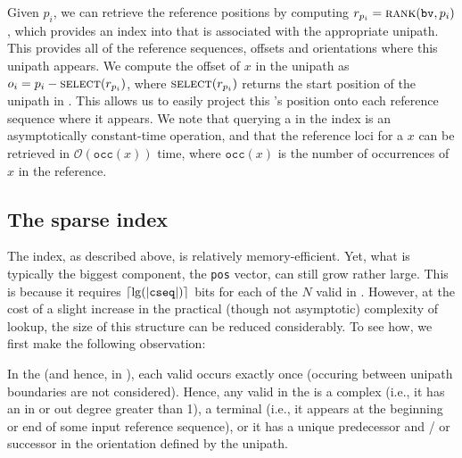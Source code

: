   Given $p_{i}$, we can retrieve the reference positions by computing $r_{p_i} =
  \mbox{\sc rank}(\texttt{bv}, p_{i})$, which provides an index into \ctab that is
  associated with the appropriate unipath. This provides all of the reference
  sequences, offsets and orientations where this unipath appears. We compute the
  offset of \kmer $x$ in the unipath as $o_{i} = p_{i} - \mbox{\sc select}(r_{p_i})$, where $\mbox{\sc select}(r_{p_i})$ returns the start position of the unipath in \ctab. This allows us to easily project this \kmer's position onto each reference sequence where it appears. We note that querying a \kmer in the \pufferfish index is
  an asymptotically constant-time operation, and that the reference loci for a
  \kmer $x$ can be retrieved in $\mathcal{O}(\texttt{occ}(x))$ time, where $\texttt{occ}(x)$
  is the number of occurrences of $x$ in the reference.

  \subsection*{The sparse \pufferfish index} \label{subsec:sparse}

  The \pufferfish index, as described above, is relatively memory-efficient. Yet, what
  is typically the biggest component, the \texttt{pos} vector, can still grow rather
  large. This is because it requires $\left\lceil \lg(\left|\texttt{cseq}\right|) \right\rceil$ bits for each of the $N$ valid
  \kmers in \cseq.  However, at the cost of a slight increase in the practical
  (though not asymptotic) complexity of lookup, the size of this structure can be
  reduced considerably. To see how, we first make the following observation:

  \begin{observation}
    In the \ccdbg (and hence, in \cseq), each valid \kmer occurs exactly once (\kmers occuring between unipath boundaries are not considered). Hence, any valid \kmer in the \ccdbg is a complex \kmer (i.e., it has an in or out degree greater than 1), a terminal \kmer (i.e., it appears at the beginning or end of some input reference sequence), or it has a unique predecessor and / or successor in the orientation defined by the unipath.
  \end{observation}

